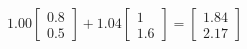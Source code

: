 \documentclass[preview]{standalone}
\begin{document}
\begin{align*}
1.00 \begin{bmatrix} 0.8 \\ 0.5 \end{bmatrix} + 1.04 \begin{bmatrix} 1 \\ 1.6 \end{bmatrix} = \begin{bmatrix} 1.84 \\ 2.17 \end{bmatrix}
\end{align*}
\end{document}
